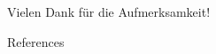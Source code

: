 \documentclass[aspectratio=1610, professionalfonts, 10pt]{beamer}
\begin{document}
\begin{frame}[focus]
	Vielen Dank für die Aufmerksamkeit!
\end{frame}


\appendix

\begin{frame}[allowframebreaks]{References}
	
	
\end{frame}




\end{document}
